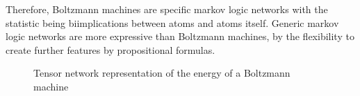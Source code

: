 Therefore, Boltzmann machines are specific markov logic networks with the statistic being biimplications between atoms and atoms itself.
Generic markov logic networks are more expressive than Boltzmann machines, by the flexibility to create further features by propositional formulas.

\begin{figure}[t]
\begin{center}
	
\end{center}
\caption{Tensor network representation of the energy of a Boltzmann machine}
\label{fig:boltzmannEnergy}
\end{figure}
























